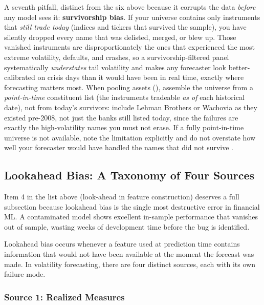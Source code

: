 \begin{warning}
A seventh pitfall, distinct from the six above because it corrupts the data \emph{before} any model sees it: \textbf{survivorship bias}.
If your universe contains only instruments that \emph{still trade today} (indices and tickers that survived the sample), you have silently dropped every name that was delisted, merged, or blew up.
Those vanished instruments are disproportionately the ones that experienced the most extreme volatility, defaults, and crashes, so a survivorship-filtered panel systematically \emph{understates} tail volatility and makes any forecaster look better-calibrated on crisis days than it would have been in real time, exactly where forecasting matters most.
When pooling assets (), assemble the universe from a \emph{point-in-time} constituent list (the instruments tradeable \emph{as of} each historical date), not from today's survivors: include Lehman Brothers or Wachovia as they existed pre-2008, not just the banks still listed today, since the failures are exactly the high-volatility names you must not erase. If a fully point-in-time universe is not available, note the limitation explicitly and do not overstate how well your forecaster would have handled the names that did not survive \citep{LopezdePrado2018}.
\end{warning}


\subsection{Lookahead Bias: A Taxonomy of Four Sources}
\label{sec:eval-lookahead-taxonomy}

Item 4 in the list above (look-ahead in feature construction) deserves a full subsection because lookahead bias is the single most destructive error in financial ML.
A contaminated model shows excellent in-sample performance that vanishes out of sample, wasting weeks of development time before the bug is identified.

Lookahead bias occurs whenever a feature used at prediction time contains information that would not have been available at the moment the forecast was made.
In volatility forecasting, there are four distinct sources, each with its own failure mode.


\subsubsection{Source 1: Realized Measures}

